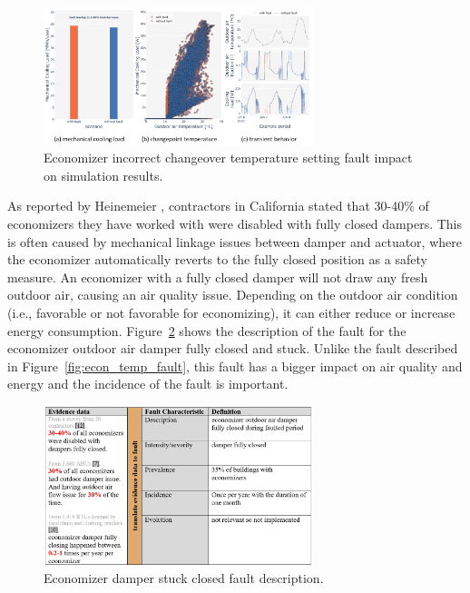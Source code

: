 \begin{figure}
  \centering \includegraphics[width=0.7\textwidth]{figures/econ_temp_fault_single_model.png}
  \caption{Economizer incorrect changeover temperature setting fault impact on simulation results.}
  \label{fig:econ_temp_fault_single_model}
\end{figure}

As reported by Heinemeier \citep{heinemeier2014free}, contractors in California stated that 30-40\% of economizers they have worked with were disabled with fully closed dampers. This is often caused by mechanical linkage issues between damper and actuator, where the economizer automatically reverts to the fully closed position as a safety measure. An economizer with a fully closed damper will not draw any fresh outdoor air, causing an air quality issue. Depending on the outdoor air condition (i.e., favorable or not favorable for economizing), it can either reduce or increase energy consumption. Figure~\ref{fig:econ_damper_fault} shows the description of the fault for the economizer outdoor air damper fully closed and stuck. Unlike the fault described in Figure~\ref{fig:econ_temp_fault}, this fault has a bigger impact on air quality and energy and the incidence of the fault is important.

\begin{figure}
  \centering \includegraphics[width=0.7\textwidth]{figures/econ_damper_fault.png}
  \caption{Economizer damper stuck closed fault description.}
  \label{fig:econ_damper_fault}
\end{figure}


